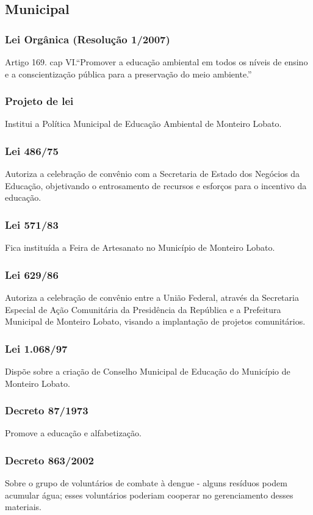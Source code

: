 \begin{subapend}
	\subsection{Municipal}
	\begin{subsubapend}
		\subsubsection{Lei Orgânica (Resolução 1/2007)}
		Artigo 169. cap VI.“Promover a educação ambiental em todos os níveis de ensino e a conscientização pública para a preservação do meio ambiente.”
		\subsubsection{Projeto de lei}
		Institui a Política Municipal de Educação Ambiental de Monteiro Lobato.
		\subsubsection{Lei 486/75}
		Autoriza a celebração de convênio com a Secretaria de Estado dos Negócios da Educação, objetivando o entrosamento de recursos e esforços para o incentivo da educação.
		\subsubsection{Lei 571/83}
		Fica instituída a Feira de Artesanato no Município de Monteiro Lobato.
		\subsubsection{Lei 629/86}
		Autoriza a celebração de convênio entre a União Federal, através da Secretaria Especial de Ação Comunitária da Presidência da República e a Prefeitura Municipal de Monteiro Lobato, visando a implantação de projetos comunitários.
		\subsubsection{Lei 1.068/97}
		Dispõe sobre a criação de Conselho Municipal de Educação do Município de Monteiro Lobato.
		\subsubsection{Decreto 87/1973}
		Promove a educação e alfabetização.
		\subsubsection{Decreto 863/2002}
		Sobre o grupo de voluntários de combate à dengue - alguns resíduos podem acumular água; esses voluntários poderiam cooperar no gerenciamento desses materiais.
	\end{subsubapend}
\end{subapend}

